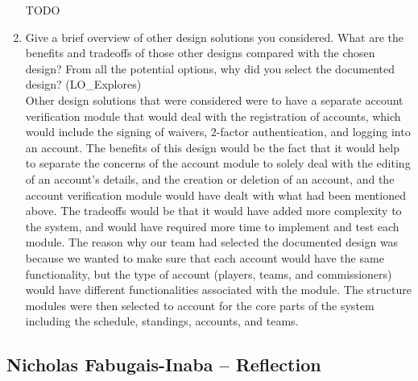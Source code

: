 \documentclass[12pt, titlepage]{article}
\begin{document}
\begin{enumerate}
    TODO\\
    
    \item Give a brief overview of other design solutions you considered.  What
    are the benefits and tradeoffs of those other designs compared with the chosen
    design?  From all the potential options, why did you select the documented design?
    (LO\_Explores)\\

    Other design solutions that were considered were to have a separate account verification module
    that would deal with the registration of accounts, which would include the signing of waivers,
    2-factor authentication, and logging into an account. The benefits of this design would be the
    fact that it would help to separate the concerns of the account module to solely deal with the
    editing of an account's details, and the creation or deletion of an account, and the account
    verification module would have dealt with what had been mentioned above. The tradeoffs would
    be that it would have added more complexity to the system, and would have required more time
    to implement and test each module. The reason why our team had selected the documented design
    was because we wanted to make sure that each account would have the same functionality, but
    the type of account (players, teams, and commissioners) would have different functionalities
    associated with the module. The structure modules were then selected to account for the
    core parts of the system including the schedule, standings, accounts, and teams.

\end{enumerate}

\subsection*{Nicholas Fabugais-Inaba -- Reflection}
\end{document}
